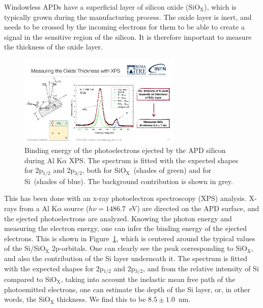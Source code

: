 \documentclass[12p]{paper}
\begin{document}
Windowless APDs have a superficial layer of silicon oxide (SiO$_\mathrm{X}$), which is typically grown during the manufacturing process. The oxide layer is inert, and needs to be crossed by the incoming electrons for them to be able to create a signal in the sensitive region of the silicon. It is therefore important to measure the thickness of the oxide layer.

\begin{figure}[tb]
  \centering
\includegraphics[width=0.69\textwidth]{figures/oxideLayer}
 \caption{Binding energy of the photoelectrons ejected by the APD silicon during Al K$\alpha$ XPS. The spectrum is fitted with the expected shapes for 2p$_{1/2}$ and 2p$_{3/2}$, both for SiO$_\mathrm{X}$~(shades of green) and for Si~(shades of blue). The background contribution is shown in grey. 
  \label{fig:oxideLayer}}
\end{figure}



This has been done with an x-ray photoelectron spectroscopy (XPS) analysis. X-rays from a Al K$\alpha$ source ($h\nu = 1486.7$~eV) are directed on the APD surface, and the ejected photoelectrons are analyzed. Knowing the photon energy and measuring the electron energy, one can infer the binding energy of the ejected electrons. This is shown in Figure~\ref{fig:oxideLayer}, which is centered around the typical values of the Si/SiO$_\mathrm{X}$ 2p-orbitals. One can clearly see the peak corresponding to SiO$_\mathrm{X}$, and also the contribution of the Si layer underneath it. The spectrum is fitted with the expected shapes for 2p$_{1/2}$ and 2p$_{3/2}$, and from the relative intensity of Si compared to SiO$_\mathrm{X}$, taking into account the inelastic mean free path of the photoemitted electrons, one can estimate the depth of the Si layer, or, in other words, the SiO$_\mathrm{X}$ thickness. We find this to be $8.5 \pm 1.0$~nm.
\end{document}
